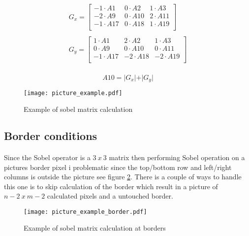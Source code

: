 \begin{equation}
\begin{array}{c}
G_x = \left[ 
\begin{array}{ccc}
	-1\cdot A1 & 0\cdot A2 & 1\cdot A3\\
    -2\cdot A9 & 0\cdot A10 & 2\cdot A11\\
    -1\cdot A17 & 0\cdot A18 & 1\cdot A19\\
\end{array} \right] \\
\\
G_y = \left[ 
\begin{array}{ccc}
	1\cdot A1 & 2\cdot A2 & 1\cdot A3\\
    0\cdot A9 & 0\cdot A10 & 0\cdot A11\\
    -1\cdot A17 & -2\cdot A18 & -2\cdot A19\\
\end{array}
\right]
\end{array}
\label{eq:sobel_calc1}
\end{equation}\\

\begin{equation}
	A10=\vert G_x\vert + \vert G_y\vert
	\label{eq:sobel_abs}
\end{equation}
 
\begin{figure}[H]
	\centering
	\texttt{[image: picture\_example.pdf]}
	\caption{Example of sobel matrix calculation}
	\label{fig:pic_matrix}
\end{figure}

\subsection{Border conditions}
\paragraph*{}
Since the Sobel operator is a $3~x~3$ matrix then performing Sobel operation on a pictures border pixel i problematic since the top/bottom row and left/right columns is outside the picture see figure \ref{fig:pic_matrix_border}. There is a couple of ways to handle this one is to skip calculation of the border which result in a picture of $n-2~x~m-2$ calculated pixels and a untouched border. 

\begin{figure}[H]
	\centering
	\texttt{[image: picture\_example\_border.pdf]}
	\caption{Example of sobel matrix calculation at borders}
	\label{fig:pic_matrix_border}
\end{figure}


